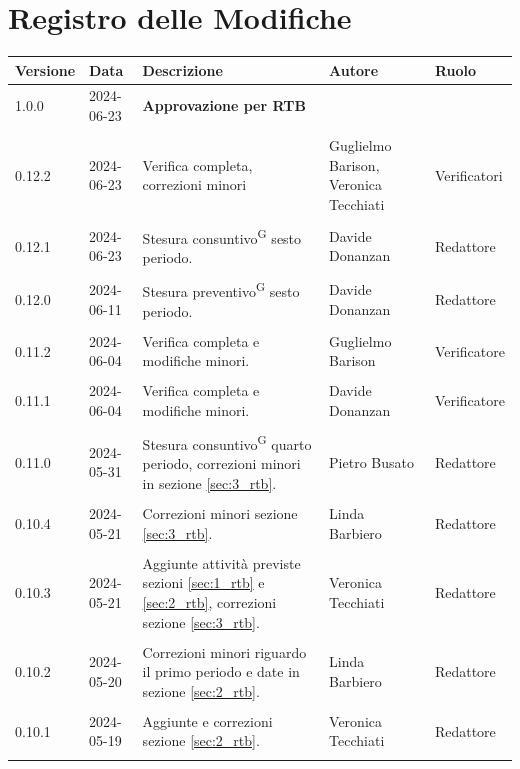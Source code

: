 \documentclass[8pt]{article}
\newcommand{\glossterm}[1]{#1\textsuperscript{G}} %
\begin{document}
\section*{Registro delle Modifiche}
\begin{table}[ht!]	
\hypersetup{hidelinks}
	\centering
	\begin{tabular}{p{1.2cm} p{2cm} p{6cm} p{3cm} p{2cm}}
		\toprule
		\textbf{Versione}& \textbf{Data} & \textbf{Descrizione} & \textbf{Autore} & \textbf{Ruolo} \\
		\midrule 
		1.0.0 & 2024-06-23 & \textbf{Approvazione per RTB} & & \\\\	
    0.12.2 & 2024-06-23 & Verifica completa, correzioni minori & Guglielmo Barison, Veronica
      Tecchiati & Verificatori  \\\\
    0.12.1 & 2024-06-23 & Stesura \glossterm{consuntivo} sesto periodo. & Davide Donanzan & Redattore \\\\
		0.12.0 & 2024-06-11 & Stesura \glossterm{preventivo} sesto periodo. & Davide Donanzan & Redattore \\\\
		0.11.2 & 2024-06-04 & Verifica completa e modifiche minori. & Guglielmo Barison & Verificatore \\\\
		0.11.1 & 2024-06-04 & Verifica completa e modifiche minori. & Davide Donanzan & Verificatore \\\\
		0.11.0 & 2024-05-31 & Stesura \glossterm{consuntivo} quarto periodo, correzioni minori in sezione \ref{sec:3_rtb}. & Pietro Busato & Redattore \\\\
        0.10.4 & 2024-05-21 & Correzioni minori sezione \ref{sec:3_rtb}. & Linda Barbiero & Redattore \\\\
		0.10.3 & 2024-05-21 & Aggiunte attività previste sezioni \ref{sec:1_rtb} e \ref{sec:2_rtb}, correzioni sezione \ref{sec:3_rtb}. & Veronica Tecchiati & Redattore \\\\
        0.10.2 & 2024-05-20 & Correzioni minori riguardo il primo periodo e date in sezione \ref{sec:2_rtb}. & Linda Barbiero & Redattore \\\\
		0.10.1 & 2024-05-19 & Aggiunte e correzioni sezione \ref{sec:2_rtb}. & Veronica Tecchiati & Redattore \\\\

\end{tabular}
\end{table}
\end{document}

